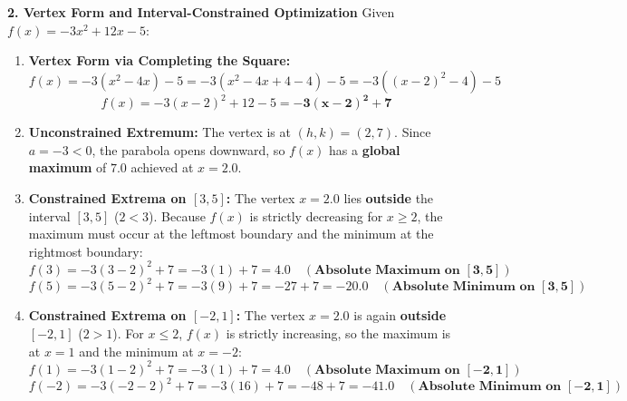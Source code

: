 \textbf{2. Vertex Form and Interval-Constrained Optimization}
Given $f(x) = -3x^2 + 12x - 5$:
\begin{enumerate}
    \item \textbf{Vertex Form via Completing the Square:}
    $$f(x) = -3(x^2 - 4x) - 5 = -3(x^2 - 4x + 4 - 4) - 5 = -3((x - 2)^2 - 4) - 5$$
    $$f(x) = -3(x - 2)^2 + 12 - 5 = \mathbf{-3(x - 2)^2 + 7}$$
    \item \textbf{Unconstrained Extremum:}
    The vertex is at $(h, k) = (2, 7)$. Since $a = -3 < 0$, the parabola opens downward, so $f(x)$ has a \textbf{global maximum} of $7.0$ achieved at $x = 2.0$.
    \item \textbf{Constrained Extrema on $[3, 5]$:}
    The vertex $x = 2.0$ lies \textbf{outside} the interval $[3, 5]$ ($2 < 3$).
    Because $f(x)$ is strictly decreasing for $x \ge 2$, the maximum must occur at the leftmost boundary and the minimum at the rightmost boundary:
    $$f(3) = -3(3 - 2)^2 + 7 = -3(1) + 7 = \mathbf{4.0 \quad (\text{Absolute Maximum on } [3, 5])}$$
    $$f(5) = -3(5 - 2)^2 + 7 = -3(9) + 7 = -27 + 7 = \mathbf{-20.0 \quad (\text{Absolute Minimum on } [3, 5])}$$
    \item \textbf{Constrained Extrema on $[-2, 1]$:}
    The vertex $x = 2.0$ is again \textbf{outside} $[-2, 1]$ ($2 > 1$).
    For $x \le 2$, $f(x)$ is strictly increasing, so the maximum is at $x = 1$ and the minimum at $x = -2$:
    $$f(1) = -3(1 - 2)^2 + 7 = -3(1) + 7 = \mathbf{4.0 \quad (\text{Absolute Maximum on } [-2, 1])}$$
    $$f(-2) = -3(-2 - 2)^2 + 7 = -3(16) + 7 = -48 + 7 = \mathbf{-41.0 \quad (\text{Absolute Minimum on } [-2, 1])}$$
\end{enumerate}

